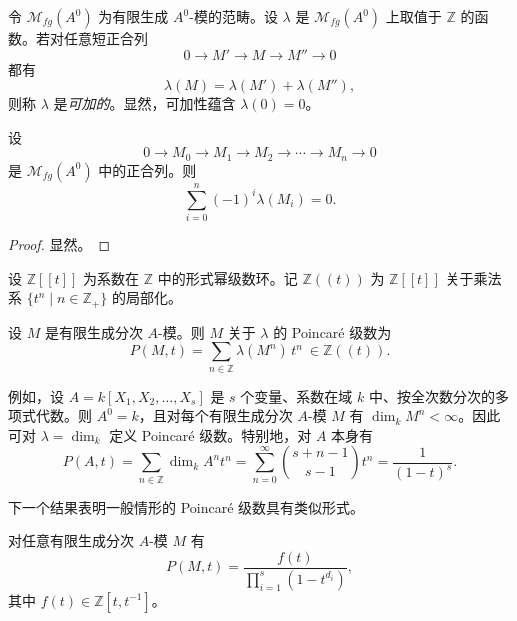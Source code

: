 令 $\mathcal{M}_{fg}(A^0)$ 为有限生成 $A^0$-模的范畴。设 $\lambda$ 是 $\mathcal{M}_{fg}(A^0)$ 上取值于 $\mathbb{Z}$ 的函数。若对任意短正合列
$$0\longrightarrow M'\longrightarrow M\longrightarrow M''\longrightarrow 0$$
都有
$$\lambda(M)=\lambda(M')+\lambda(M''),$$
则称 $\lambda$ 是\emph{可加的}。显然，可加性蕴含 $\lambda(0)=0$。

\begin{lemma}
设
$$0\to M_0\to M_1\to M_2\to\cdots\to M_n\to 0$$
是 $\mathcal{M}_{fg}(A^0)$ 中的正合列。则
$$\sum_{i=0}^n (-1)^i\lambda(M_i)=0.$$
\end{lemma}

\begin{proof}
显然。
\end{proof}

设 $\mathbb{Z}[[t]]$ 为系数在 $\mathbb{Z}$ 中的形式幂级数环。记 $\mathbb{Z}((t))$ 为 $\mathbb{Z}[[t]]$ 关于乘法系 $\{t^n\mid n\in\mathbb{Z}_+\}$ 的局部化。

设 $M$ 是有限生成分次 $A$-模。则 $M$ 关于 $\lambda$ 的 Poincaré 级数为
$$P(M,t)=\sum_{n\in\mathbb{Z}}\lambda(M^n)\,t^n\ \in \mathbb{Z}((t)).$$

例如，设 $A=k[X_1,X_2,\dots,X_s]$ 是 $s$ 个变量、系数在域 $k$ 中、按全次数分次的多项式代数。则 $A^0=k$，且对每个有限生成分次 $A$-模 $M$ 有 $\dim_k M^n<\infty$。因此可对 $\lambda=\dim_k$ 定义 Poincaré 级数。特别地，对 $A$ 本身有
$$P(A,t)=\sum_{n\in\mathbb{Z}}\dim_k A^n t^n=\sum_{n=0}^{\infty}\binom{s+n-1}{s-1}t^n=\frac{1}{(1-t)^s}.$$

下一个结果表明一般情形的 Poincaré 级数具有类似形式。

\begin{theorem}
对任意有限生成分次 $A$-模 $M$ 有
$$P(M,t)=\frac{f(t)}{\prod_{i=1}^s (1-t^{d_i})},$$
其中 $f(t)\in\mathbb{Z}[t,t^{-1}]$。
\end{theorem}

